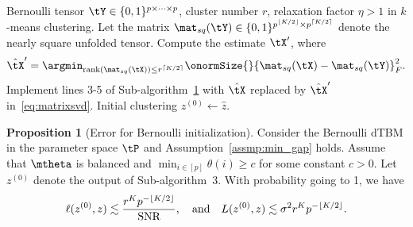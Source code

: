 \documentclass[lettersize,onecolumn,journal]{IEEEtran}
\theoremstyle{definition}
\newtheorem{prop}{Proposition}
\theoremstyle{definition}
\newcommand{\Mat}{\text{Mat}}
\DeclarePairedDelimiter{\ceil}{\lceil}{\rceil}
\DeclarePairedDelimiter{\floor}{\lfloor}{\rfloor}
\begin{document}
{\begin{itemize}[wide]
{\begin{algorithm}[h!]
\caption*{\bf Sub-algorithm 3: Weighted higher-order initialization for Bernoulli observation}
\vspace{.15cm}
\begin{algorithmic}[1] 
\INPUT Bernoulli tensor $\tY \in \{0,1\}^{p\times \cdots \times p}$, cluster number $r$, relaxation factor $\eta > 1$ in $k$-means clustering.
\State  Let the matrix $\mat_{sq} (\tY) \in \{0,1\}^{p^{\floor{K/2}} \times p^{\ceil{K/2}} }$ denote the nearly square unfolded tensor. Compute the estimate $\tX'$, where
\begin{equation}\label{eq:matrixsvd}
    \hat \tX' = \argmin_{\text{rank}(\mat_{sq}(\tX)) \leq r^{\ceil{K/2}}} \onormSize{}{ \mat_{sq}(\tX) -  \mat_{sq}(\tY)}_F^2.
\end{equation}
\State Implement lines 3-5 of Sub-algorithm~\hyperref[alg:main]{1} with $\hat \tX$ replaced by $\hat \tX'$ in~\eqref{eq:matrixsvd}.
\OUTPUT Initial clustering $z^{(0)} \leftarrow \hat z$.
\end{algorithmic}
\end{algorithm}

\begin{prop}[Error for Bernoulli initialization]\label{prop:ber} Consider the Bernoulli dTBM in the parameter space $\tP$ and Assumption~\ref{assmp:min_gap} holds. Assume that $\mtheta$ is balanced and $\min_{i\in[p]}\theta(i) \geq c$ for some constant $c>0$. Let $ z^{(0)}$ denote the output of Sub-algorithm~3. With probability going to 1, we have
\begin{equation}\label{eq:ini_b}
 \ell(z^{(0)}, z) \lesssim \frac{r^K p^{- \floor{K/2} }}{\text{SNR}}, \quad \text{and} \quad L(z^{(0)}, z) \lesssim  {\sigma^2 r^K p^{-\floor{K/2}}}.
\end{equation}
\end{prop}


}
\end{itemize}}
\end{document}
